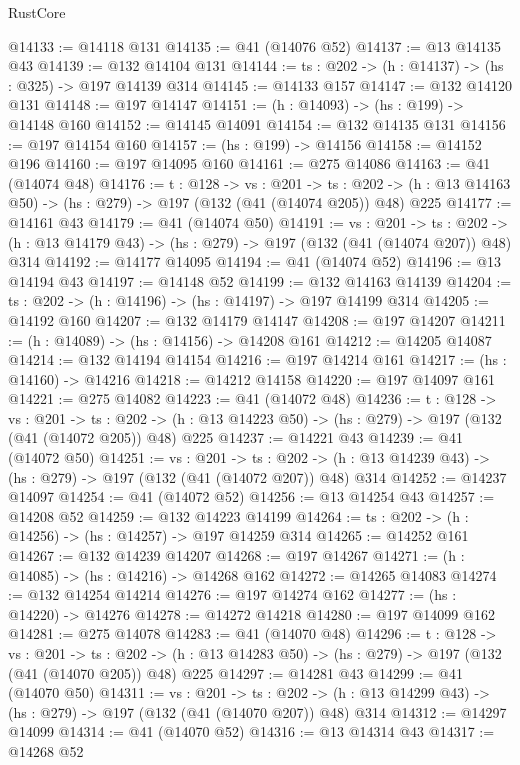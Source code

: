 \begin{lexlean}{RustCore}
\begin{coremodule}
@14133 := @14118 @131
@14135 := @41 (@14076 @52)
@14137 := @13 @14135 @43
@14139 := @132 @14104 @131
@14144 := {ts : @202} -> (h : @14137) -> (hs : @325) -> @197 @14139 @314
@14145 := @14133 @157
@14147 := @132 @14120 @131
@14148 := @197 @14147
@14151 := (h : @14093) -> (hs : @199) -> @14148 @160
@14152 := @14145 @14091
@14154 := @132 @14135 @131
@14156 := @197 @14154 @160
@14157 := (hs : @199) -> @14156
@14158 := @14152 @196
@14160 := @197 @14095 @160
@14161 := @275 @14086
@14163 := @41 (@14074 @48)
@14176 := {t : @128} ->
  {vs : @201} ->
  {ts : @202} -> (h : @13 @14163 @50) -> (hs : @279) -> @197 (@132 (@41 (@14074 @205)) @48) @225
@14177 := @14161 @43
@14179 := @41 (@14074 @50)
@14191 := {vs : @201} ->
  {ts : @202} -> (h : @13 @14179 @43) -> (hs : @279) -> @197 (@132 (@41 (@14074 @207)) @48) @314
@14192 := @14177 @14095
@14194 := @41 (@14074 @52)
@14196 := @13 @14194 @43
@14197 := @14148 @52
@14199 := @132 @14163 @14139
@14204 := {ts : @202} -> (h : @14196) -> (hs : @14197) -> @197 @14199 @314
@14205 := @14192 @160
@14207 := @132 @14179 @14147
@14208 := @197 @14207
@14211 := (h : @14089) -> (hs : @14156) -> @14208 @161
@14212 := @14205 @14087
@14214 := @132 @14194 @14154
@14216 := @197 @14214 @161
@14217 := (hs : @14160) -> @14216
@14218 := @14212 @14158
@14220 := @197 @14097 @161
@14221 := @275 @14082
@14223 := @41 (@14072 @48)
@14236 := {t : @128} ->
  {vs : @201} ->
  {ts : @202} -> (h : @13 @14223 @50) -> (hs : @279) -> @197 (@132 (@41 (@14072 @205)) @48) @225
@14237 := @14221 @43
@14239 := @41 (@14072 @50)
@14251 := {vs : @201} ->
  {ts : @202} -> (h : @13 @14239 @43) -> (hs : @279) -> @197 (@132 (@41 (@14072 @207)) @48) @314
@14252 := @14237 @14097
@14254 := @41 (@14072 @52)
@14256 := @13 @14254 @43
@14257 := @14208 @52
@14259 := @132 @14223 @14199
@14264 := {ts : @202} -> (h : @14256) -> (hs : @14257) -> @197 @14259 @314
@14265 := @14252 @161
@14267 := @132 @14239 @14207
@14268 := @197 @14267
@14271 := (h : @14085) -> (hs : @14216) -> @14268 @162
@14272 := @14265 @14083
@14274 := @132 @14254 @14214
@14276 := @197 @14274 @162
@14277 := (hs : @14220) -> @14276
@14278 := @14272 @14218
@14280 := @197 @14099 @162
@14281 := @275 @14078
@14283 := @41 (@14070 @48)
@14296 := {t : @128} ->
  {vs : @201} ->
  {ts : @202} -> (h : @13 @14283 @50) -> (hs : @279) -> @197 (@132 (@41 (@14070 @205)) @48) @225
@14297 := @14281 @43
@14299 := @41 (@14070 @50)
@14311 := {vs : @201} ->
  {ts : @202} -> (h : @13 @14299 @43) -> (hs : @279) -> @197 (@132 (@41 (@14070 @207)) @48) @314
@14312 := @14297 @14099
@14314 := @41 (@14070 @52)
@14316 := @13 @14314 @43
@14317 := @14268 @52

\end{coremodule}
\end{lexlean}
